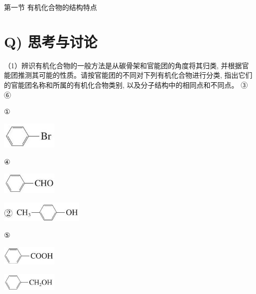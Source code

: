 \documentclass[10pt]{article}
\begin{document}
第一节 有机化合物的结构特点

\section*{Q) 思考与讨论}

（1）辨识有机化合物的一般方法是从碳骨架和官能团的角度将其归类, 并根据官能团推测其可能的性质。请按官能团的不同对下列有机化合物进行分类, 指出它们的官能团名称和所属的有机化合物类别, 以及分子结构中的相同点和不同点。 ③ ⑥

①

\begin{center}
\includegraphics[max width=0.2\textwidth]{images/0190efc5-b58a-7c43-bfb0-e0a030df9cfd_11_754360.jpg}
\end{center}

④

\begin{center}
\includegraphics[max width=0.2\textwidth]{images/0190efc5-b58a-7c43-bfb0-e0a030df9cfd_11_361361.jpg}
\end{center}

\begin{center}
\includegraphics[max width=0.3\textwidth]{images/0190efc5-b58a-7c43-bfb0-e0a030df9cfd_11_265851.jpg}
\end{center}

⑤

\begin{center}
\includegraphics[max width=0.2\textwidth]{images/0190efc5-b58a-7c43-bfb0-e0a030df9cfd_11_784009.jpg}
\end{center}

\begin{center}
\includegraphics[max width=0.2\textwidth]{images/0190efc5-b58a-7c43-bfb0-e0a030df9cfd_11_522612.jpg}
\end{center}
\end{document}
